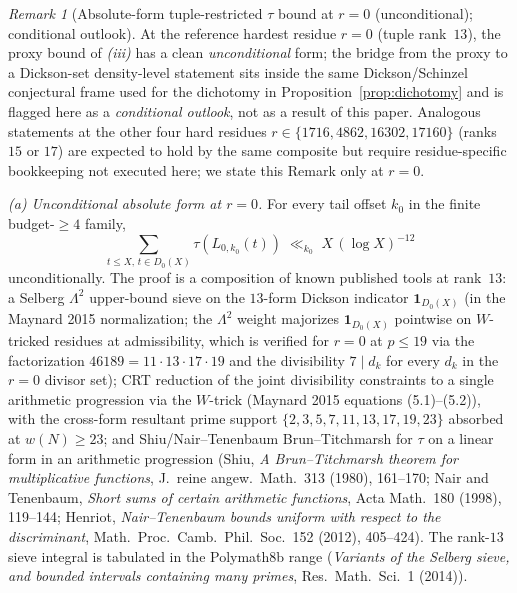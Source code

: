 \documentclass[11pt]{article}
\renewcommand{\_}{\origunderscore\allowbreak}
\theoremstyle{definition}
\theoremstyle{remark}
\newtheorem{remark}[theorem]{Remark}
\begin{document}
\begin{remark}[Absolute-form tuple-restricted $\tau$ bound at $r=0$ (unconditional); conditional outlook]\label{rem:track2_absolute}
At the reference hardest residue $r=0$ (tuple rank~$13$), the
proxy bound of \emph{(iii)} has a clean \emph{unconditional}
form; the bridge from the proxy to a Dickson-set density-level
statement sits inside the same Dickson/Schinzel conjectural frame
used for the dichotomy in Proposition~\ref{prop:dichotomy} and is
flagged here as a \emph{conditional outlook}, not as a result of
this paper. Analogous statements at the other four hard residues
$r\in\{1716,4862,16302,17160\}$ (ranks~$15$ or $17$) are expected
to hold by the same composite but require residue-specific
bookkeeping not executed here; we state this Remark only at $r=0$.

\emph{(a) Unconditional absolute form at $r=0$.} For every tail
offset $k_0$ in the finite budget-$\ge 4$ family,
\[
  \sum_{t\le X,\,t\in D_0(X)} \tau(L_{0,k_0}(t))
  \;\ll_{k_0}\; X\,(\log X)^{-12}
\]
unconditionally. The proof is a composition of known published
tools at rank~$13$: a Selberg $\Lambda^{2}$ upper-bound sieve on
the $13$-form Dickson indicator $\mathbf{1}_{D_0(X)}$ (in the
Maynard 2015 normalization; the $\Lambda^{2}$ weight majorizes
$\mathbf{1}_{D_0(X)}$ pointwise on $W$-tricked residues at
admissibility, which is verified for $r=0$ at $p\le 19$ via the
factorization $46189=11\cdot 13\cdot 17\cdot 19$ and the
divisibility $7\mid d_k$ for every $d_k$ in the $r=0$ divisor
set); CRT reduction of the joint divisibility constraints to a
single arithmetic progression via the $W$-trick (Maynard 2015
equations (5.1)--(5.2)), with the cross-form resultant prime
support $\{2,3,5,7,11,13,17,19,23\}$ absorbed at $w(N)\ge 23$;
and Shiu/Nair--Tenenbaum Brun--Titchmarsh for $\tau$ on a linear
form in an arithmetic progression (Shiu, \emph{A Brun--Titchmarsh
theorem for multiplicative functions}, J.\ reine angew.\ Math.\
313 (1980), 161--170; Nair and Tenenbaum, \emph{Short sums of
certain arithmetic functions}, Acta Math.\ 180 (1998), 119--144;
Henriot, \emph{Nair--Tenenbaum bounds uniform with respect to the
discriminant}, Math.\ Proc.\ Camb.\ Phil.\ Soc.\ 152 (2012),
405--424). The rank-$13$ sieve integral is tabulated in the
Polymath8b range
(\emph{Variants of the Selberg sieve, and bounded intervals
containing many primes}, Res.\ Math.\ Sci.\ 1 (2014)).


\end{remark}
\end{document}
